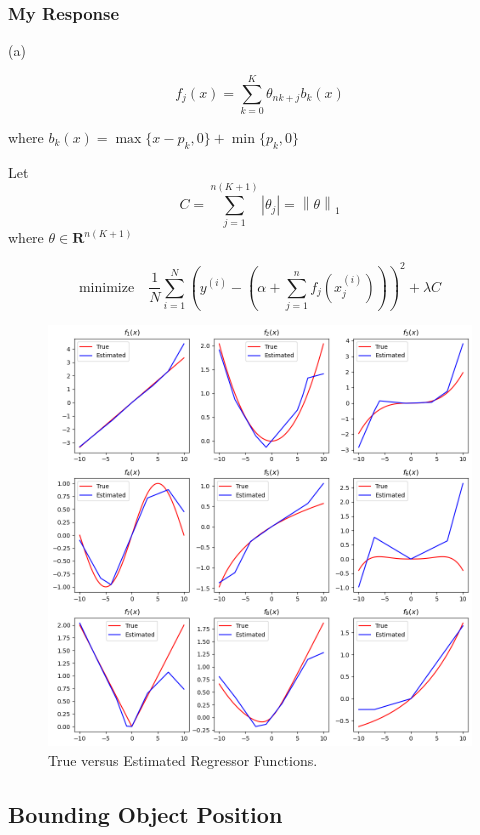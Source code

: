 \documentclass[12pt,reqno]{article}
\theoremstyle{definition}
\numberwithin{equation}{section}
\begin{document}
\subsubsection*{My Response}

\noindent (a) 

\[f_{j}(x) = \sum_{k=0}^{K}\theta_{nk + j} b_k(x)\]

where $b_k(x) = \max\{x-p_k, 0\} + \min\{p_k, 0\}$

Let 
\[C = \sum_{j=1}^{n(K+1)} \left| \theta_j \right| = \left\lVert \theta \right\rVert_{1} \]
where $\theta \in \mathbf{R}^{n(K+1)}$

\[\mathrm{minimize} \quad \frac{1}{N} \sum_{i=1}^{N}\left(y^{(i)} - (\alpha + \sum_{j=1}^{n}f_j(x_j^{(i)}) ) \right)^2 + \lambda C\]

\begin{figure}[htbp]
    \centering
    \includegraphics[width=\linewidth]{../examples/364a/cvx-ch7/gen_add_regr_fit.png}
    \caption{True versus Estimated Regressor Functions.}
    \label{fig:gen_add_fit}
\end{figure}

\subsection{Bounding Object Position}
\end{document}
